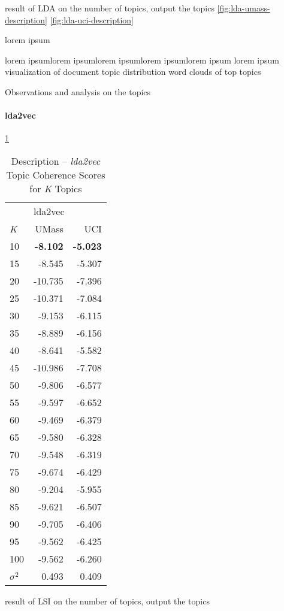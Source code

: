 \documentclass[letterpaper,12pt]{article}
\begin{document}
result of LDA on the number of topics, output the topics
\ref{fig:lda-umass-description}
\ref{fig:lda-uci-description}

lorem ipsum

lorem ipsumlorem ipsumlorem ipsumlorem ipsumlorem ipsum
lorem ipsum
\newpage
visualization of document topic distribution
word clouds of top topics

Observations and analysis on the topics

\paragraph{lda2vec}

\ref{tab:lda2vec_description_tc}
\begin{table}
	\caption{\label{tab:lda2vec_description_tc} Description -- \emph{lda2vec} Topic Coherence Scores for \emph{K} Topics}
	\begin{center}
		\begin{tabular}{lrr}
			\toprule
				{} & \multicolumn{2}{l}{lda2vec} \\
				\emph{K} &   UMass &    UCI \\
				\midrule
				10  &  \textbf{-8.102} & \textbf{-5.023} \\
				15  &  -8.545 & -5.307 \\
				20  & -10.735 & -7.396 \\
				25  & -10.371 & -7.084 \\
				30  &  -9.153 & -6.115 \\
				35  &  -8.889 & -6.156 \\
				40  &  -8.641 & -5.582 \\
				45  & -10.986 & -7.708 \\
				50  &  -9.806 & -6.577 \\
				55  &  -9.597 & -6.652 \\
				60  &  -9.469 & -6.379 \\
				65  &  -9.580 & -6.328 \\
				70  &  -9.548 & -6.319 \\
				75  &  -9.674 & -6.429 \\
				80  &  -9.204 & -5.955 \\
				85  &  -9.621 & -6.507 \\
				90  &  -9.705 & -6.406 \\
				95  &  -9.562 & -6.425 \\
				100 &  -9.562 & -6.260 \\
			\midrule
			$\sigma^2$ & 0.493 & 0.409 \\
			\bottomrule
		\end{tabular}
	\end{center}
\end{table}
result of LSI on the number of topics, output the topics
\end{document}
